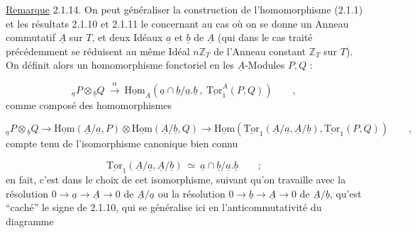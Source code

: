 \underline{Remarque} 2.1.14. On peut généraliser la construction de l'homomorphisme (2.1.1) et les résultats 2.1.10 et 2.1.11 le concernant au cas où on se donne un Anneau commutatif $\underline{A}$ sur $T$, et deux Idéaux $\underline{a}$ et $\underline{b}$ de $\underline{A}$ (qui dans le cas traité précédemment se réduisent au même Idéal $n\mathbb{Z}_T$ de
l'Anneau constant $\mathbb{Z}_T$ sur $T$). On définit alors un homomorphisme fonctoriel en les $\underline{A}$-Modules $P,Q$ :

\begin{equation}\tag{2.1.14.1}
{}_{\underline{a}}P \otimes {}_{\underline{b}}Q \ \overset{\alpha}{\longrightarrow}\ \underline{\mathrm{Hom}}_A(\underline{a} \cap \underline{b}/\underline{a}.\underline{b}\ ,\ \underline{\mathrm{Tor}}^A_1(P,Q)) \qquad ,
\end{equation}
comme composé des homomorphismes

\begin{equation*}
{}_{\underline{a}}P \otimes {}_{\underline{b}}Q \to \underline{\mathrm{Hom}}(\underline{A}/\underline{a},P) \otimes \underline{\mathrm{Hom}}(\underline{A}/\underline{b},Q) \longrightarrow \underline{\mathrm{Hom}}(\underline{\mathrm{Tor}}_1(\underline{A}/\underline{a},\underline{A}/\underline{b}),\underline{\mathrm{Tor}}_1(P,Q)) \qquad ,
\end{equation*}
compte tenu de l'isomorphisme canonique bien connu

\begin{equation}\tag{2.1.14.2}
\underline{\mathrm{Tor}}_1(\underline{A}/\underline{a},\underline{A}/\underline{b}) \ \simeq\ \underline{a} \cap \underline{b}/\underline{a}.\underline{b} \qquad ;
\end{equation}
en fait, c'est dans le choix de cet isomorphisme, suivant qu'on travaille avec la résolution $0 \longrightarrow \underline{a} \longrightarrow \underline{A} \longrightarrow 0$ de $\underline{A}/\underline{a}$ ou la résolution $0 \longrightarrow \underline{b} \to \underline{A} \to 0$ de $\underline{A}/\underline{b}$, qu'est ``caché'' le signe de 2.1.10, qui se généralise ici en l'anticommutativité du diagramme

